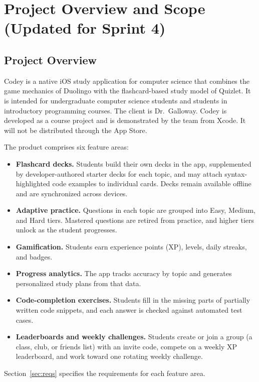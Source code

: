 \documentclass[12pt,letterpaper]{article}
\begin{document}
\section{Project Overview and Scope (Updated for Sprint 4)}

\subsection{Project Overview}
Codey is a native iOS study application for computer science that combines the game
mechanics of Duolingo with the flashcard-based study model of Quizlet. It is intended
for undergraduate computer science students and students in introductory programming
courses. The client is Dr.\ Galloway. Codey is developed as a course project and is
demonstrated by the team from Xcode. It will not be distributed through the App Store.

The product comprises six feature areas:
\begin{itemize}
  \item \textbf{Flashcard decks.} Students build their own decks in the app, supplemented by developer-authored starter
        decks for each topic, and may attach
        syntax-highlighted code examples to individual cards. Decks remain available
        offline and are synchronized across devices.
  \item \textbf{Adaptive practice.} Questions in each topic are grouped into Easy,
        Medium, and Hard tiers. Mastered questions are retired from practice, and
        higher tiers unlock as the student progresses.
  \item \textbf{Gamification.} Students earn experience points (XP), levels, daily
        streaks, and badges.
  \item \textbf{Progress analytics.} The app tracks accuracy by topic and generates
        personalized study plans from that data.
  \item \textbf{Code-completion exercises.} Students fill in the missing parts of
        partially written code snippets, and each answer is checked
        against automated test cases.
  \item \textbf{Leaderboards and weekly challenges.} Students create or join a group
        (a class, club, or friends list) with an invite code, compete on a weekly XP
        leaderboard, and work toward one rotating weekly challenge.
\end{itemize}
Section~\ref{sec:reqs} specifies the requirements for each feature area.
\end{document}
